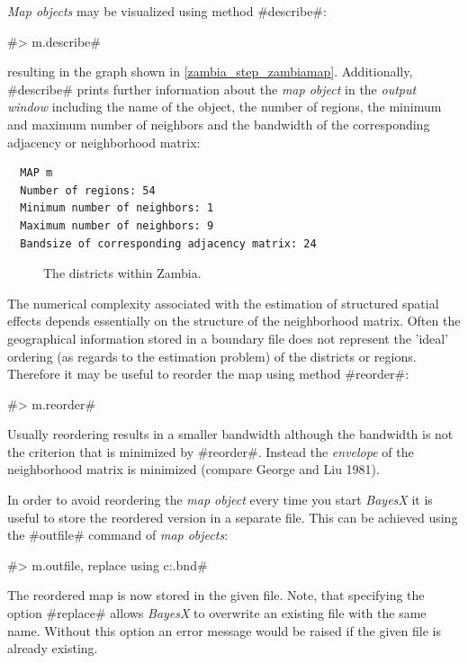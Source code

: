 \documentclass[11pt,a4paper,twoside]{bayesxreport}
\begin{document}
{\it Map objects} may be visualized using method #describe#:

#> m.describe#

resulting in the graph shown in \autoref{zambia_step_zambiamap}.
Additionally, #describe# prints further information about the {\it
map object} in the {\it output window} including the name of the
object, the number of regions, the minimum and maximum number of
neighbors and the bandwidth of the corresponding adjacency or
neighborhood matrix:

\begin{verbatim}
  MAP m
  Number of regions: 54
  Minimum number of neighbors: 1
  Maximum number of neighbors: 9
  Bandsize of corresponding adjacency matrix: 24
\end{verbatim}

\begin{figure}[ht]
\begin{center}
 {\it\caption{The
districts within Zambia.\label{zambia_step_zambiamap}}}
\end{center}
\end{figure}


The numerical complexity associated with the estimation of
structured spatial effects depends essentially on the structure of
the neighborhood matrix. Often the geographical information stored
in a boundary file does not represent the 'ideal' ordering (as
regards to the estimation problem) of the districts or regions.
Therefore it may be useful to reorder the map using method
#reorder#:

#> m.reorder#

Usually reordering results in a smaller bandwidth although the
bandwidth is not the criterion that is minimized by #reorder#.
Instead the {\it envelope} of the neighborhood matrix is minimized
(compare George and Liu 1981).

In order to avoid reordering the {\it map object} every time you
start {\it BayesX} it is useful to store the reordered version in a
separate file. This can be achieved using the #outfile# command of
{\it map objects}:

#> m.outfile, replace using c:\data\zambiasort.bnd#

The reordered map is now stored in the given file. Note, that
specifying the option #replace# allows {\it BayesX} to overwrite an
existing file with the same name. Without this option an error
message would be raised if the given file is already existing.
\end{document}
